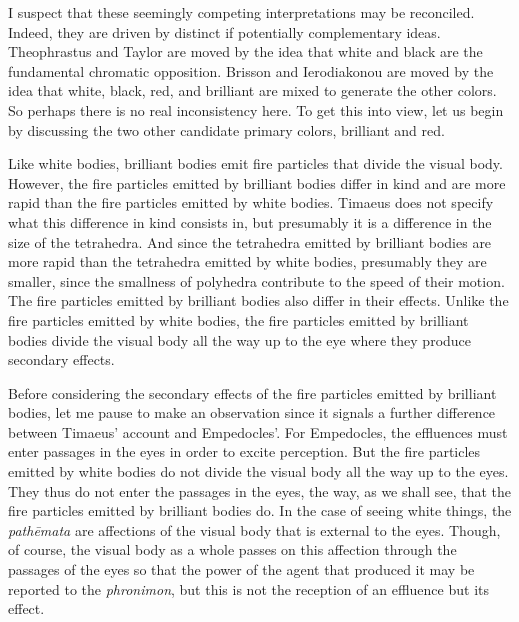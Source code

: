 I suspect that these seemingly competing interpretations may be reconciled. Indeed, they are driven by distinct if potentially complementary ideas. Theophrastus and Taylor are moved by the idea that white and black are the fundamental chromatic opposition. Brisson and Ierodiakonou are moved by the idea that white, black, red, and brilliant are mixed to generate the other colors. So perhaps there is no real inconsistency here. To get this into view, let us begin by discussing the two other candidate primary colors, brilliant and red.

Like white bodies, brilliant bodies emit fire particles that divide the visual body. However, the fire particles emitted by brilliant bodies differ in kind and are more rapid than the fire particles emitted by white bodies. Timaeus does not specify what this difference in kind consists in, but presumably it is a difference in the size of the tetrahedra. And since the tetrahedra emitted by brilliant bodies are more rapid than the tetrahedra emitted by white bodies, presumably they are smaller, since the smallness of polyhedra contribute to the speed of their motion. The fire particles emitted by brilliant bodies also differ in their effects. Unlike the fire particles emitted by white bodies, the fire particles emitted by brilliant bodies divide the visual body all the way up to the eye where they produce secondary effects.

Before considering the secondary effects of the fire particles emitted by brilliant bodies, let me pause to make an observation since it signals a further difference between Timaeus' account and Empedocles'. For Empedocles, the effluences must enter passages in the eyes in order to excite perception. But the fire particles emitted by white bodies do not divide the visual body all the way up to the eyes. They thus do not enter the passages in the eyes, the way, as we shall see, that the fire particles emitted by brilliant bodies do. In the case of seeing white things, the \emph{pathēmata} are affections of the visual body that is external to the eyes. Though, of course, the visual body as a whole passes on this affection through the passages of the eyes so that the power of the agent that produced it may be reported to the \emph{phronimon}, but this is not the reception of an effluence but its effect. 

